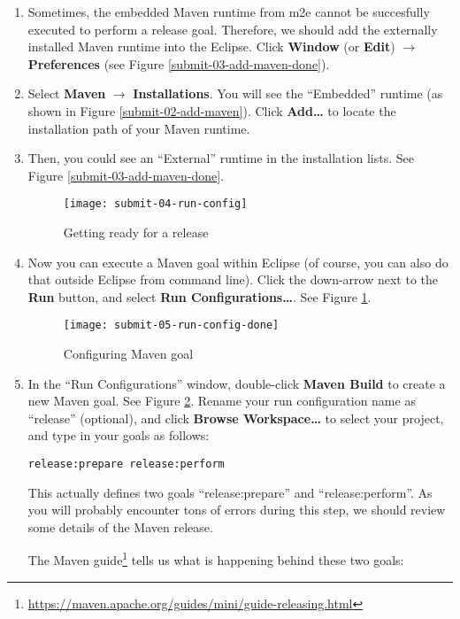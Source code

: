 \begin{enumerate}
\item Sometimes, the embedded Maven runtime from m2e cannot be succesfully executed to perform a release goal. Therefore, we should add the externally installed Maven runtime into the Eclipse. Click \textbf{Window} (or \textbf{Edit}) $\rightarrow$ \textbf{Preferences} (see Figure \ref{submit-03-add-maven-done}).
\item Select \textbf{Maven} $\rightarrow$ \textbf{Installations}. You will see the ``Embedded'' runtime (as shown in Figure \ref{submit-02-add-maven}). Click \textbf{Add\ldots} to locate the installation path of your Maven runtime.
\item Then, you could see an ``External'' runtime in the installation lists. See Figure \ref{submit-03-add-maven-done}.

\begin{figure}
\centering
\texttt{[image: submit-04-run-config]}
\caption{Getting ready for a release\label{submit-04-run-config}}
\end{figure}

\item Now you can execute a Maven goal within Eclipse (of course, you can also do that outside Eclipse from command line). Click the down-arrow next to the \textbf{Run} button, and select \textbf{Run Configurations\ldots}. See Figure \ref{submit-04-run-config}.

\begin{figure}
\centering
\texttt{[image: submit-05-run-config-done]}
\caption{Configuring Maven goal\label{submit-05-run-config-done}}
\end{figure}

\item In the ``Run Configurations'' window, double-click \textbf{Maven Build} to create a new Maven goal. See Figure \ref{submit-05-run-config-done}. Rename your run configuration name as ``release'' (optional), and click \textbf{Browse Workspace\ldots} to select your project, and type in your goals as follows:

\begin{verbatim}
release:prepare release:perform
\end{verbatim}

This actually defines two goals ``release:prepare'' and ``release:perform''. As you will probably encounter tons of errors during this step, we should review some details of the Maven release.

The Maven guide\footnote{\url{https://maven.apache.org/guides/mini/guide-releasing.html}} tells us what is happening behind these two goals:


\end{enumerate}
